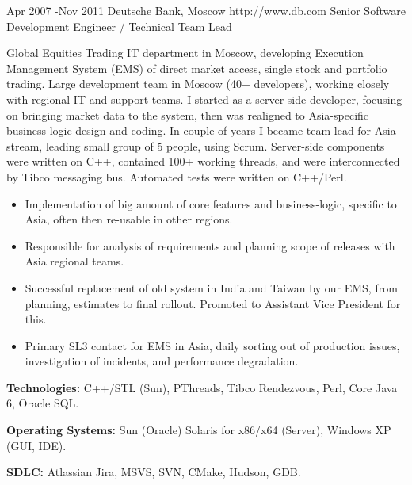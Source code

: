 \documentclass[10pt]{article} %
\begin{document}
\job
{Apr 2007 -}{Nov 2011}
{Deutsche Bank, Moscow}
{http://www.db.com}
{Senior Software Development Engineer / Technical Team Lead}
{Global Equities Trading IT department in Moscow, developing Execution Management System (EMS) of direct market access,
single stock and portfolio trading. Large development team in Moscow (40+ developers), working closely with regional IT 
and support teams. I started as a server-side developer, focusing on bringing market data to the system, then was realigned
to Asia-specific business logic design and coding. In couple of years I became team lead for Asia stream, 
leading small group of 5 people, using Scrum. Server-side components were written on C++, contained 100+ working threads,
and were interconnected by Tibco messaging bus. Automated tests were written on C++/Perl.
\begin{itemize}
\item{Implementation of big amount of core features and business-logic, specific to Asia, often then re-usable in other regions.}
\item{Responsible for analysis of requirements and planning scope of releases with Asia regional teams.}
\item{Successful replacement of old system in India and Taiwan by our EMS, from planning, estimates to final rollout.
Promoted to Assistant Vice President for this.}
\item{Primary SL3 contact for EMS in Asia, daily sorting out of production issues, investigation of incidents,
and performance degradation.}
\end{itemize}
\rule{0mm}{5mm}\textbf{Technologies:} C++/STL (Sun), PThreads, Tibco Rendezvous, Perl, Core Java 6, Oracle SQL.\\
\rule{0mm}{5mm}\textbf{Operating Systems:} Sun (Oracle) Solaris for x86/x64 (Server), Windows XP (GUI, IDE).\\
\rule{0mm}{5mm}\textbf{SDLC:} Atlassian Jira, MSVS, SVN, CMake, Hudson, GDB.
}

\end{document}
